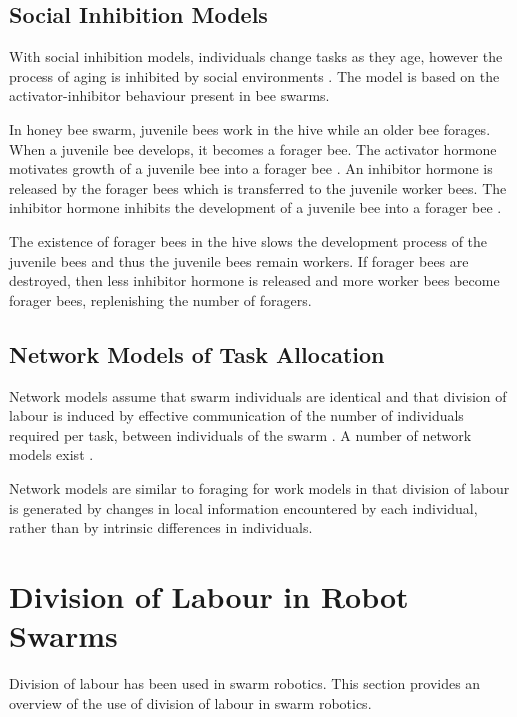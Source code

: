    

\subsection{Social Inhibition Models}
With social inhibition models, individuals change tasks as they age, however the process of aging is inhibited by social environments \cite{huang1992honeybee}. The model is based on the activator-inhibitor behaviour present in bee swarms. 

In honey bee swarm, juvenile bees work in the hive while an older bee forages. When a juvenile bee develops, it becomes a forager bee. The activator hormone motivates growth of a juvenile bee into a forager bee \cite{robinson1989genetic}. An inhibitor hormone is released by the forager bees which is transferred to the juvenile worker bees. The inhibitor hormone inhibits the development of a juvenile bee into a forager bee \cite{huang1992honeybee}.

The existence of forager bees in the hive slows the development process of the juvenile bees and thus the juvenile bees remain workers. If forager bees are destroyed, then less inhibitor hormone is released and more worker bees become forager bees, replenishing the number of foragers. 

                                
\subsection{Network Models of Task Allocation}

Network models assume that swarm individuals are identical and that division of labour is induced by effective communication of the number of individuals required per task, between individuals of the swarm \cite{gordon1992parallel}. A number of network models exist \cite{gordon1992parallel,pacala1996effects}.

Network models are similar to foraging for work models in that division of labour is generated by changes in local information encountered by each individual, rather than by intrinsic differences in individuals. 


\section{Division of Labour in Robot Swarms}
\label{background:divisionoflabour:robotswarm}
Division of labour has been used in swarm robotics. This section provides an overview of the use of division of labour in swarm robotics.


